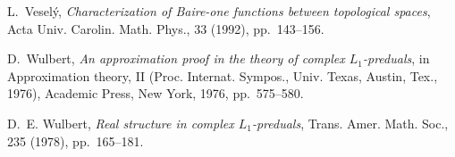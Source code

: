 \documentclass{amsart}
\numberwithin{equation}{section}
\theoremstyle{definition}
\begin{document}
\begin{thebibliography}{10}
{\sc L.~Vesel{\'y}}, {\em Characterization of {B}aire-one functions between
  topological spaces}, Acta Univ. Carolin. Math. Phys., 33 (1992),
  pp.~143--156.

{\sc D.~Wulbert}, {\em An approximation proof in the theory of complex
  {$L_{1}$}-preduals}, in Approximation theory, {II} ({P}roc. {I}nternat.
  {S}ympos., {U}niv. {T}exas, {A}ustin, {T}ex., 1976), Academic Press, New
  York, 1976, pp.~575--580.

{\sc D.~E. Wulbert}, {\em Real structure in complex {$L_{1}$}-preduals}, Trans.
  Amer. Math. Soc., 235 (1978), pp.~165--181.

\end{thebibliography}
\end{document}
